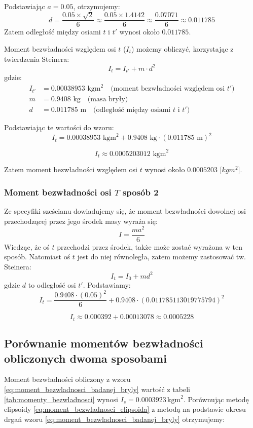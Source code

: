 \documentclass[a4paper,12pt]{article}
\begin{document}
Podstawiając $a = 0.05$, otrzymujemy:
\[
    d = \frac{0.05 \times \sqrt{2}}{6} \approx \frac{0.05 \times 1.4142}{6} \approx \frac{0.07071}{6} \approx 0.011785
\]
Zatem odległość między osiami $t$ i $t'$ wynosi około $0.011785$.\par


Moment bezwładności względem osi $t$ ($I_t$) możemy obliczyć, korzystając z twierdzenia Steinera:
\[
    I_t = I_{t'} + m \cdot d^2
\]
gdzie:
\begin{align*}
    I_{t'} & = 0.00038953 \text{ kgm}^2 \quad \text{(moment bezwładności względem osi } t') \\
    m      & = 0.9408 \text{ kg} \quad \text{(masa bryły)}                                  \\
    d      & = 0.011785 \text{ m} \quad \text{(odległość między osiami } t \text{ i } t')
\end{align*}

Podstawiając te wartości do wzoru:
\[
    I_t = 0.00038953 \text{ kgm}^2 + 0.9408 \text{ kg} \cdot (0.011785 \text{ m})^2
\]

\[
    I_t \approx 0.0005203012 \text{ kgm}^2
\]

Zatem moment bezwładności względem osi $t$ wynosi około $0.0005203$ [$kgm^2$].

\subsubsection*{Moment bezwładności osi $T$ sposób 2}

Ze specyfiki sześcianu dowiadujemy się, że moment bezwładności dowolnej osi przechodzącej przez jego środek masy wyraża się:
\[
    I = \frac{ma^2}{6}
\]
Wiedząc, że oś $t$ przechodzi przez środek, także może zostać wyrażona w ten sposób. Natomiast oś $t$ jest do niej równoległa, zatem możemy zastosować tw. Steinera:
\[
    I_t = I_0 + md^2
\]
gdzie $d$ to odległość osi $t'$.
Podstawiamy:
\[
    I_t = \frac{0.9408 \cdot (0.05)^2}{6} + 0.9408 \cdot (0.011785113019775794)^2
\]

\[
    I_t \approx 0.000392 + 0.00013078 \approx 0.0005228
\]

\subsection{Porównanie momentów bezwładności obliczonych dwoma sposobami}

Moment bezwładności obliczony z wzoru \eqref{eq:moment_bezwladnosci_badanej_bryly} wartość z tabeli \ref{tab:momenty_bezwladnosci} wynosi $I_s = 0.0003923\,\text{kgm}^2$.
Porównując metodę elipsoidy \eqref{eq:moment_bezwladnosci_elipsoida} z metodą na podstawie okresu   drgań wzoru \eqref{eq:moment_bezwladnosci_badanej_bryly} otrzymujemy:
\end{document}
